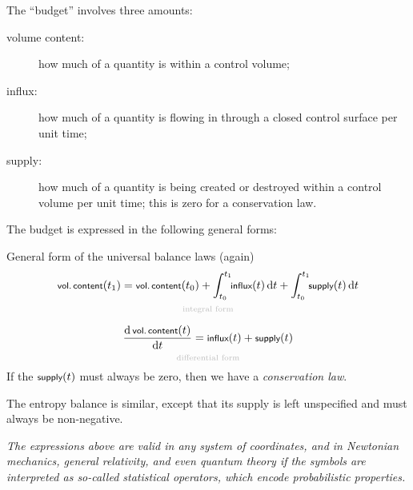 \documentclass[a4paper,12pt,%
onecolumn,oneside,titlepage,%
british%
]{memoir}
\newcommand*{\di}{\mathrm{d}}%
\renewcommand*{\|}[1][]{\nonscript\:#1\vert\nonscript\:\mathopen{}}
\newcommand*{\yti}{t_{0}}
\newcommand*{\ytf}{t_{1}}
\begin{document}
The \enquote{budget} involves three amounts:
\begin{description}
\item[volume content:] how much of a quantity is within a control volume;
\item[influx:] how much of a quantity is flowing in through a closed control surface per unit time;
\item[supply:] how much of a quantity is being created or destroyed within a control volume per unit time; this is zero for a conservation law.
\end{description}

The budget is expressed in the following general forms:
\begin{definition}{General form of the universal balance laws (again)}
  \begin{equation*}
    \begin{gathered}[t]
      \underbracket[0pt]{\textsf{\footnotesize vol.\,content}(\ytf) = \textsf{\footnotesize vol.\,content}(\yti) + \int_{\yti}^{\ytf}\!\!\textsf{\footnotesize influx}(t)\,\di t + \int_{\yti}^{\ytf}\!\!\textsf{\footnotesize supply}(t)\,\di t}_{\mathclap{\text{\color{grey}integral form}}}
      \\[2\jot]
      \underbracket[0pt]{\frac{\di\,\textsf{\footnotesize vol.\,content}(t)}{\di t} = \textsf{\footnotesize influx}(t) + \textsf{\footnotesize supply}(t)}_{\mathclap{\text{\color{grey}differential form}}}
    \end{gathered}
  \end{equation*}
  If the $\textsf{\footnotesize supply}(t)$ must always be zero, then we have a \emph{conservation law}.

  \smallskip

    The entropy balance is similar, except that its supply is left unspecified and must always be non-negative.

      \smallskip

  \emph{The expressions above are valid in any system of coordinates, and in Newtonian mechanics, general relativity, and even quantum theory if the symbols are interpreted as so-called statistical operators, which encode probabilistic properties.}
\end{definition}
\end{document}
